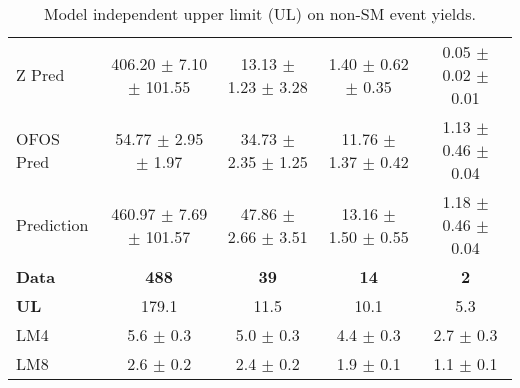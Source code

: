 \begin{table}[hbt]
  \begin{center}
	\caption{
	  \label{tab:modinul}
	  Model independent upper limit (UL) on non-SM event yields.
	}
	\begin{tabular}{lcccc}
	  \hline
	  \resulttitle
\hline
Z Pred & 406.20 $\pm$ 7.10 $\pm$ 101.55  &    13.13 $\pm$ 1.23 $\pm$ 3.28  &     1.40 $\pm$ 0.62 $\pm$ 0.35  &     0.05 $\pm$ 0.02 $\pm$ 0.01 \\

OFOS Pred &  54.77 $\pm$ 2.95 $\pm$ 1.97  &    34.73 $\pm$ 2.35 $\pm$ 1.25  &    11.76 $\pm$ 1.37 $\pm$ 0.42  &     1.13 $\pm$ 0.46 $\pm$ 0.04 \\

\hline
Prediction & 460.97 $\pm$ 7.69 $\pm$ 101.57  &    47.86 $\pm$ 2.66 $\pm$ 3.51  &    13.16 $\pm$ 1.50 $\pm$ 0.55  &     1.18 $\pm$ 0.46 $\pm$ 0.04  \\

\hline
\bf Data      &             \bf 488    &                 \bf 39  &                 \bf 14  &              \bf 2  \\
\hline
{\bf UL}        &179.1  &  11.5  &  10.1  &  5.3\\

\hline
LM4          &      5.6 $\pm$ 0.3  &  5.0 $\pm$ 0.3  &  4.4 $\pm$ 0.3  &  2.7 $\pm$ 0.3   \\
LM8          &      2.6 $\pm$ 0.2  &  2.4 $\pm$ 0.2  &  1.9 $\pm$ 0.1  &  1.1 $\pm$ 0.1   \\



\hline
	\end{tabular}
  \end{center}
\end{table}

\newcommand{\ulloose}{10.1}
\newcommand{\ultight}{5.3}

